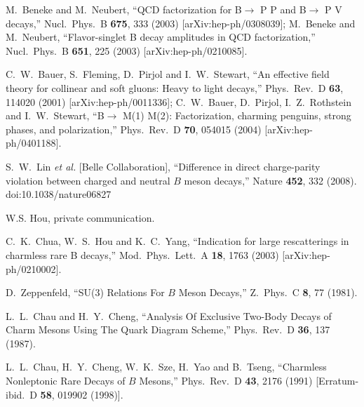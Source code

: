 \documentclass[aps,preprint,floats,epsf,epsfig,nofootinbib,letter]{revtex4}
\begin{document}
\begin{thebibliography}{99}
  M.~Beneke and M.~Neubert,
  ``QCD factorization for B$\to$ P P and B$\to$ P V decays,''
  Nucl.\ Phys.\  B {\bf 675}, 333 (2003)
  [arXiv:hep-ph/0308039];
M.~Beneke and M.~Neubert,
  ``Flavor-singlet B decay amplitudes in QCD factorization,''
  Nucl.\ Phys.\  B {\bf 651}, 225 (2003)
  [arXiv:hep-ph/0210085].


  C.~W.~Bauer, S.~Fleming, D.~Pirjol and I.~W.~Stewart,
  ``An effective field theory for collinear and soft gluons: Heavy to light
  decays,''
  Phys.\ Rev.\  D {\bf 63}, 114020 (2001)
  [arXiv:hep-ph/0011336];
  C.~W.~Bauer, D.~Pirjol, I.~Z.~Rothstein and I.~W.~Stewart,
  ``B$\to$ M(1) M(2): Factorization, charming penguins, strong phases, and
  polarization,''
  Phys.\ Rev.\  D {\bf 70}, 054015 (2004)
  [arXiv:hep-ph/0401188].

  S.~W.~Lin {\it et al.} [Belle Collaboration],
  ``Difference in direct charge-parity violation between charged and neutral $B$ meson decays,''
  Nature {\bf 452}, 332 (2008).
  doi:10.1038/nature06827

W.S. Hou, private communication.



C.~K.~Chua, W.~S.~Hou and K.~C.~Yang,
  ``Indication for large rescatterings in charmless rare B decays,''
  Mod.\ Phys.\ Lett.\  A {\bf 18}, 1763 (2003)
  [arXiv:hep-ph/0210002].


 
D.~Zeppenfeld,
``SU(3) Relations For $B$ Meson Decays,''
Z.\ Phys.\ C {\bf 8}, 77 (1981).


L.~L.~Chau and H.~Y.~Cheng,
``Analysis Of Exclusive Two-Body Decays of Charm Mesons Using The Quark Diagram Scheme,''
Phys.\ Rev.\ D {\bf 36}, 137 (1987).


L.~L.~Chau, H.~Y.~Cheng, W.~K.~Sze, H.~Yao and B.~Tseng,
``Charmless Nonleptonic Rare Decays of $B$ Mesons,''
Phys.\ Rev.\ D {\bf 43}, 2176 (1991) [Erratum-ibid.\ D {\bf 58},
019902 (1998)].



\end{thebibliography}
\end{document}
